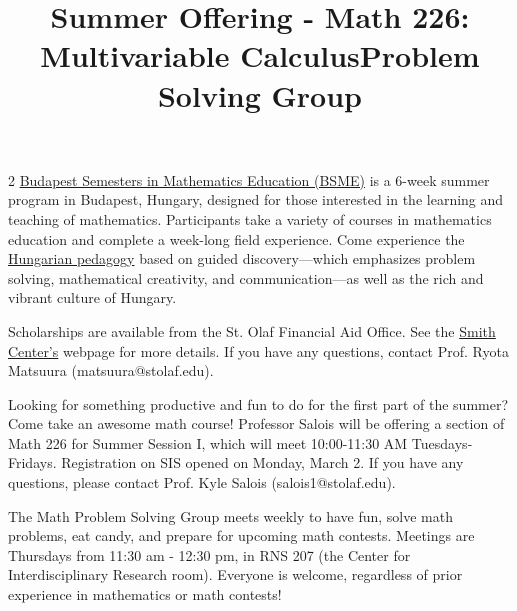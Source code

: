 \documentclass[12pt]{article}
\newcommand{\bolder}{\textbf}
\begin{document}
\begin{multicols}{2}
\href {https://bsmeducation.com} {Budapest Semesters in Mathematics Education (BSME)} is a 6-week summer program in Budapest, Hungary, designed for those interested in the learning and teaching of mathematics. Participants take a variety of courses in mathematics education and complete a week-long field experience. Come experience the \href{https://bsmeducation.com/wp-content/uploads/2020/02/hungarian-pedagogy-flyer.pdf}{Hungarian pedagogy} based on guided discovery—which emphasizes problem solving, mathematical creativity, and communication—as well as the rich and vibrant culture of Hungary.

Scholarships are available from the St. Olaf Financial Aid Office. See the \href{https://wp.stolaf.edu/smithcenter/st-olaf-summer-programs/#:~:text=All%20students%20are%20automatically%20considered%20for%20a%20need%2Dbased%20scholarship%20(see%20J%2DTerm%20column)%20of%20up%20to%2050%25%20of%20program%20costs%20from%20the%20St.%20Olaf%20Financial%20Aid%20Office.%C2%A0%C2%A0}{Smith Center's} webpage for more details. If you have any questions, contact Prof. Ryota Matsuura (matsuura@stolaf.edu).

\begin{tcolorbox}[colback=white, colframe=black]
    \begin{center}
    \title{{\large \bolder{Summer Offering - Math 226: Multivariable Calculus}}}
    \end{center}
\end{tcolorbox}
Looking for something productive and fun to do for the first part of the summer?  Come take an awesome math course!  Professor Salois will be offering a section of Math 226 for Summer Session I, which will meet 10:00-11:30 AM Tuesdays-Fridays.  Registration on SIS opened on Monday, March 2.  If you have any questions, please contact Prof. Kyle Salois (salois1@stolaf.edu). 



\begin{tcolorbox}[colback=white, colframe=black]
    \begin{center}
    \title{{\large \bolder{Problem Solving Group}}}
    \end{center}
\end{tcolorbox}
The Math Problem Solving Group meets weekly to have fun, solve math problems, eat candy, and prepare for upcoming math contests. Meetings are Thursdays from 11:30 am - 12:30 pm, in RNS 207 (the Center for Interdisciplinary Research room). Everyone is welcome, regardless of prior experience in mathematics or math contests!


\end{multicols} \vfill 
\end{document}

